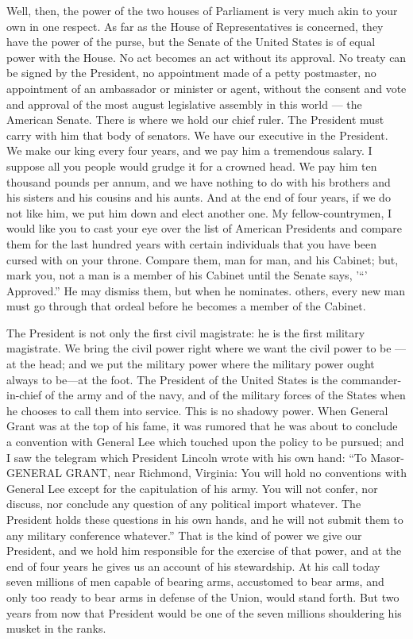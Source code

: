 \documentclass[11pt,openany]{book}
\begin{document}
Well, then, the power of the two houses of Parliament is very much akin to your own in one respect. As far as the House of Representatives is concerned, they have the power of the purse, but the Senate of the United States is of equal power with the House. No act becomes an act without its approval. No treaty can be signed by the President, no appointment made of a petty postmaster, no appointment of an ambassador or minister or agent, without the consent and vote and approval of the most august legislative assembly in this world --- the American Senate. There is where we hold our chief ruler. The President must carry with him that body of senators. We have our executive in the President. We make our king every four years, and we pay him a tremendous salary. I suppose all you people would grudge it for a crowned head. We pay him ten thousand pounds per annum, and we have nothing to do with his brothers and his sisters and his cousins and his aunts. And at the end of four years, if we do not like him, we put him down and elect another one. My fellow-countrymen, I would like you to cast your eye over the list of American Presidents and compare them for the last hundred years with certain individuals that you have been cursed with on your throne. Compare them, man for man, and his Cabinet; but, mark you, not a man is a member of his Cabinet until the Senate says, '``' Approved.'' He may dismiss them, but when he nominates. others, every new man must go through that ordeal before he becomes a member of the Cabinet.

The President is not only the first civil magistrate: he is the first military magistrate. We bring the civil power right where we want the civil power to be ---at the head; and we put the military power where the military power ought always to be---at the foot. The President of the United States is the commander-in-chief of the army and of the navy, and of the military forces of the States when he chooses to call them into service. This is no shadowy power. When General Grant was at the top of his fame, it was rumored that he was about to conclude a convention with General Lee which touched upon the policy to be pursued; and I saw the telegram which President Lincoln wrote with his own hand: ``To Masor-GENERAL GRANT, near Richmond, Virginia: You will hold no conventions with General Lee except for the capitulation of his army. You will not confer, nor discuss, nor conclude any question of any political import whatever. The President holds these questions in his own hands, and he will not submit them to any military conference whatever.'' That is the kind of power we give our President, and we hold him responsible for the exercise of that power, and at the end of four years he gives us an account of his stewardship. At his call today seven millions of men capable of bearing arms, accustomed to bear arms, and only too ready to bear arms in defense of the Union, would stand forth. But two years from now that President would be one of the seven millions shouldering his musket in the ranks.
\end{document}

